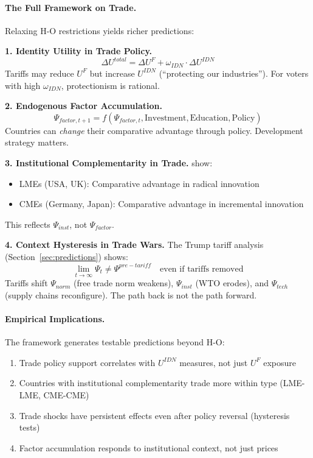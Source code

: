 \paragraph{The Full Framework on Trade.}
Relaxing H-O restrictions yields richer predictions:

\textbf{1. Identity Utility in Trade Policy.}
\begin{equation}
  \Delta U^{total} = \Delta U^F + \omega_{IDN} \cdot \Delta U^{IDN}
\end{equation}
Tariffs may reduce $U^F$ but increase $U^{IDN}$ (``protecting our industries'').
For voters with high $\omega_{IDN}$, protectionism is rational.

\textbf{2. Endogenous Factor Accumulation.}
\begin{equation}
  \Psi_{factor,t+1} = f(\Psi_{factor,t}, \text{Investment}, \text{Education}, \text{Policy})
\end{equation}
Countries can \emph{change} their comparative advantage through policy.
Development strategy matters.

\textbf{3. Institutional Complementarity in Trade.}
\citet{hallsoskice2001} show:
\begin{itemize}
  \item LMEs (USA, UK): Comparative advantage in radical innovation
  \item CMEs (Germany, Japan): Comparative advantage in incremental innovation
\end{itemize}
This reflects $\Psi_{inst}$, not $\Psi_{factor}$.

\textbf{4. Context Hysteresis in Trade Wars.}
The Trump tariff analysis (Section~\ref{sec:predictions}) shows:
\begin{equation}
  \lim_{t \to \infty} \Psi_t \neq \Psi^{pre-tariff} \quad \text{even if tariffs removed}
\end{equation}
Tariffs shift $\Psi_{norm}$ (free trade norm weakens), $\Psi_{inst}$ (WTO erodes),
and $\Psi_{tech}$ (supply chains reconfigure). The path back is not the path forward.

\paragraph{Empirical Implications.}
The framework generates testable predictions beyond H-O:
\begin{enumerate}
  \item Trade policy support correlates with $U^{IDN}$ measures, not just $U^F$ exposure
  \item Countries with institutional complementarity trade more within type (LME-LME, CME-CME)
  \item Trade shocks have persistent effects even after policy reversal (hysteresis tests)
  \item Factor accumulation responds to institutional context, not just prices
\end{enumerate}


